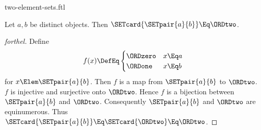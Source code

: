 \documentclass{stex}
\begin{document}
\begin{smodule}{two-element-sets.ftl}

\begin{proposition}[forthel]
  Let $a, b$ be distinct objects.
  Then $\SETcard{\SETpair{a}{b}} \Eq \ORDtwo$.
\end{proposition}
\begin{proof}[forthel]
  Define \[ f(x) \DefEq
    \begin{cases}
      \ORDzero & x \Eq a
      \\
      \ORDone & x \Eq b
    \end{cases} \]
  for $x \Elem \SETpair{a}{b}$.
  Then $f$ is a map from $\SETpair{a}{b}$ to $\ORDtwo$.
  $f$ is injective and surjective onto $\ORDtwo$.
  Hence $f$ is a bijection between $\SETpair{a}{b}$ and $\ORDtwo$.
  Consequently $\SETpair{a}{b}$ and $\ORDtwo$ are equinumerous.
  Thus $\SETcard{\SETpair{a}{b}} \Eq \SETcard{\ORDtwo} \Eq \ORDtwo$.
\end{proof}
\end{smodule}
\end{document}
